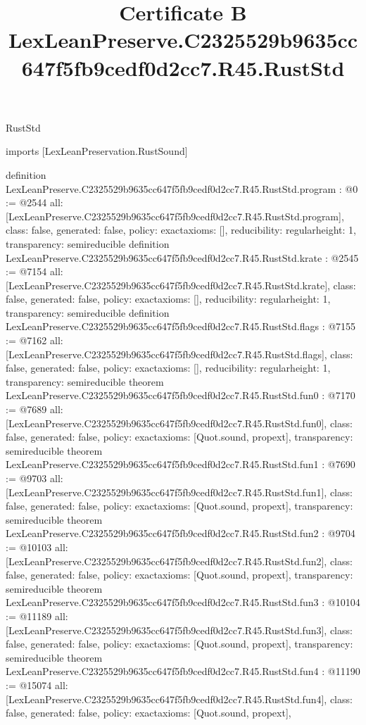 \begin{lexlean}{RustStd}
\title{Certificate B LexLeanPreserve.C2325529b9635cc647f5fb9cedf0d2cc7.R45.RustStd}
\begin{coremodule}
imports [LexLeanPreservation.RustSound]

definition LexLeanPreserve.C2325529b9635cc647f5fb9cedf0d2cc7.R45.RustStd.program : @0 := @2544 {
  all: [LexLeanPreserve.C2325529b9635cc647f5fb9cedf0d2cc7.R45.RustStd.program],
  class: false,
  generated: false,
  policy: exact{axioms: []},
  reducibility: regular{height: 1},
  transparency: semireducible
}
definition LexLeanPreserve.C2325529b9635cc647f5fb9cedf0d2cc7.R45.RustStd.krate : @2545 := @7154 {
  all: [LexLeanPreserve.C2325529b9635cc647f5fb9cedf0d2cc7.R45.RustStd.krate],
  class: false,
  generated: false,
  policy: exact{axioms: []},
  reducibility: regular{height: 1},
  transparency: semireducible
}
definition LexLeanPreserve.C2325529b9635cc647f5fb9cedf0d2cc7.R45.RustStd.flags : @7155 := @7162 {
  all: [LexLeanPreserve.C2325529b9635cc647f5fb9cedf0d2cc7.R45.RustStd.flags],
  class: false,
  generated: false,
  policy: exact{axioms: []},
  reducibility: regular{height: 1},
  transparency: semireducible
}
theorem LexLeanPreserve.C2325529b9635cc647f5fb9cedf0d2cc7.R45.RustStd.fun0 : @7170 := @7689 {
  all: [LexLeanPreserve.C2325529b9635cc647f5fb9cedf0d2cc7.R45.RustStd.fun0],
  class: false,
  generated: false,
  policy: exact{axioms: [Quot.sound, propext]},
  transparency: semireducible
}
theorem LexLeanPreserve.C2325529b9635cc647f5fb9cedf0d2cc7.R45.RustStd.fun1 : @7690 := @9703 {
  all: [LexLeanPreserve.C2325529b9635cc647f5fb9cedf0d2cc7.R45.RustStd.fun1],
  class: false,
  generated: false,
  policy: exact{axioms: [Quot.sound, propext]},
  transparency: semireducible
}
theorem LexLeanPreserve.C2325529b9635cc647f5fb9cedf0d2cc7.R45.RustStd.fun2 : @9704 := @10103 {
  all: [LexLeanPreserve.C2325529b9635cc647f5fb9cedf0d2cc7.R45.RustStd.fun2],
  class: false,
  generated: false,
  policy: exact{axioms: [Quot.sound, propext]},
  transparency: semireducible
}
theorem LexLeanPreserve.C2325529b9635cc647f5fb9cedf0d2cc7.R45.RustStd.fun3 : @10104 := @11189 {
  all: [LexLeanPreserve.C2325529b9635cc647f5fb9cedf0d2cc7.R45.RustStd.fun3],
  class: false,
  generated: false,
  policy: exact{axioms: [Quot.sound, propext]},
  transparency: semireducible
}
theorem LexLeanPreserve.C2325529b9635cc647f5fb9cedf0d2cc7.R45.RustStd.fun4 : @11190 := @15074 {
  all: [LexLeanPreserve.C2325529b9635cc647f5fb9cedf0d2cc7.R45.RustStd.fun4],
  class: false,
  generated: false,
  policy: exact{axioms: [Quot.sound, propext]},
}
\end{coremodule}
\end{lexlean}
